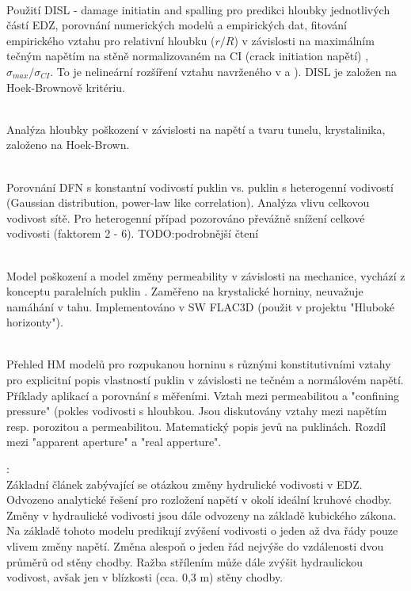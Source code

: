\documentclass{article}
\def\todo#1{{TODO:\color{violet}#1}}
\begin{document}
\\
Použití DISL - damage initiatin and spalling pro predikci hloubky jednotlivých částí EDZ,
porovnání numerických modelů a empirických dat, fitování empirického vztahu pro relativní hloubku 
($r/R$) v závislosti na maximálním tečným napětím na stěně normalizovaném na CI (crack initiation napětí)
,$\sigma_{max} / \sigma_{CI}$. To je nelineární rozšíření vztahu navrženého v
\cite{Martin1999} a \cite{Diederichs2007}). 
DISL je založen na Hoek-Brownově kritériu.

\\
Analýza hloubky poškození v závislosti na napětí a tvaru tunelu, krystalinika, založeno na Hoek-Brown.

\\
Porovnání DFN s konstantní vodivostí puklin vs. puklin s heterogenní vodivostí (Gaussian distribution, power-law like correlation). Analýza vlivu celkovou vodivost sítě. Pro heterogenní případ pozorováno převážně snížení celkové vodivosti (faktorem 2 - 6). \todo{podrobnější čtení}



\\
Model poškození a model změny permeability v závislosti na mechanice, vychází z konceptu paralelních puklin \cite{Snow1965}. Zaměřeno na krystalické horniny, neuvažuje namáhání v tahu.  Implementováno v SW FLAC3D (použit v projektu "Hluboké horizonty").

\\
Přehled HM modelů pro rozpukanou horninu s různými konstitutivními 
vztahy pro explicitní popis vlastností puklin v závislosti ne tečném a normálovém napětí. 
Příklady aplikací a porovnání s měřeními.
Vztah mezi permeabilitou a "confining pressure" 
(pokles vodivosti s hloubkou. Jsou diskutovány vztahy mezi napětím resp. 
porozitou a permeabilitou. Matematický popis jevů na puklinách. Rozdíl mezi "apparent aperture" 
a "real apperture". 



{\bf \cite{Kelsall1984}}:\\
Základní článek zabývající se otázkou změny hydrulické vodivosti v EDZ. 
Odvozeno analytické řešení pro rozložení napětí v okolí ideální kruhové chodby. 
Změny v hydraulické vodivosti jsou dále odvozeny na základě kubického zákona. 
Na základě tohoto modelu predikují zvýšení vodivosti o jeden až dva řády pouze vlivem změny napětí. Změna alespoň o jeden řád nejvýše do vzdálenosti dvou průměrů od stěny chodby. Ražba střílením může dále zvýšit hydraulickou vodivost, avšak jen v blízkosti (cca. 0,3 m) stěny chodby.
\end{document}
